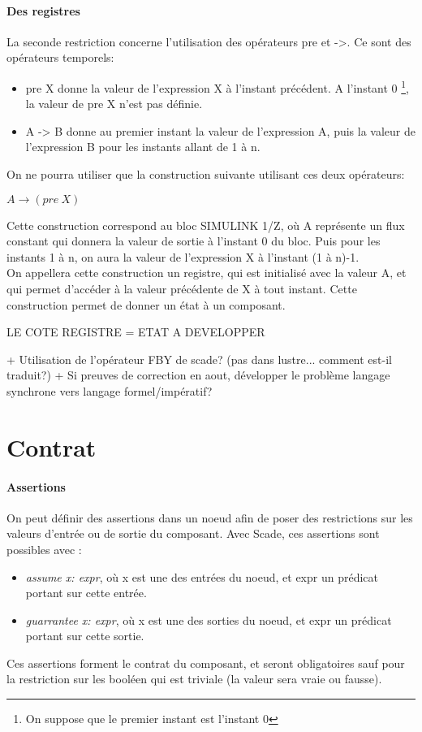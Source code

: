 \paragraph{Des registres}
La seconde restriction concerne l'utilisation des opérateurs pre et
->. Ce sont des opérateurs temporels:
\begin{itemize}
\item pre X donne la valeur de l'expression X à l'instant précédent. A
l'instant 0 \footnote{On suppose que le premier instant est l'instant
0}, la valeur de pre X n'est pas définie. 
\item A -> B donne au premier instant la valeur de l'expression A, 
puis la valeur de l'expression B pour les instants allant de 1 à n. 
\end{itemize}
On ne pourra utiliser que la construction suivante utilisant ces deux
opérateurs: 
\begin{center}
$A\rightarrow(pre~X)$
\end{center}
Cette construction correspond au bloc SIMULINK 1/Z, où A représente un
flux constant qui donnera la valeur de sortie à l'instant 0 du
bloc. Puis pour les instants 1 à n, on aura la valeur de l'expression
X à l'instant (1 à n)-1. \\
On appellera cette construction un registre, qui est initialisé avec la
valeur A, et qui permet d'accéder à la valeur précédente de X à tout
instant. Cette construction permet de donner un état à un composant.

LE COTE REGISTRE = ETAT A DEVELOPPER

+ Utilisation de l'opérateur FBY de scade? (pas dans lustre... comment est-il traduit?)
+ Si preuves de correction en aout, développer le problème langage synchrone
vers langage formel/impératif?



\section{Contrat}

\paragraph{Assertions}
On peut définir des assertions dans un noeud afin de poser des
restrictions sur les valeurs d'entrée ou de sortie du composant. Avec
Scade, ces assertions sont possibles avec :
\begin{itemize}
\item \emph{assume x: expr}, où x est une des entrées du noeud, et
expr un prédicat portant sur cette entrée.
\item \emph{guarrantee x: expr}, où x est une des sorties du noeud, et
expr un prédicat portant sur cette sortie.
\end{itemize}
Ces assertions forment le contrat du composant, et seront
obligatoires sauf pour la restriction sur les booléen qui est triviale (la
valeur sera vraie ou fausse).\\

